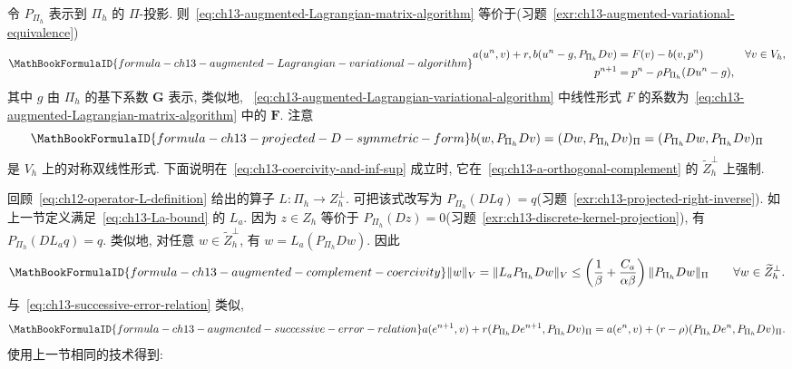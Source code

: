 令 $P_{\Pi_h}$ 表示到 $\Pi_h$ 的 $\Pi$-投影. 则~\eqref{eq:ch13-augmented-Lagrangian-matrix-algorithm} 等价于(习题~\ref{exr:ch13-augmented-variational-equivalence})
\begin{equation}
\MathBookFormulaID{formula-ch13-augmented-Lagrangian-variational-algorithm}
\label{eq:ch13-augmented-Lagrangian-variational-algorithm}
\begin{aligned}
a(u^n,v)+r,b(u^n-g,P_{\Pi_h}Dv)
&=F(v)-b(v,p^n)&&\forall v\in V_h,\\
p^{n+1}&=p^n-\rho P_{\Pi_h}(Du^n-g),
\end{aligned}
\end{equation}
其中 $g$ 由 $\Pi_h$ 的基下系数 $\mathbf G$ 表示, 类似地, ~\eqref{eq:ch13-augmented-Lagrangian-variational-algorithm} 中线性形式 $F$ 的系数为~\eqref{eq:ch13-augmented-Lagrangian-matrix-algorithm} 中的 $\mathbf F$. 注意
\[
\MathBookFormulaID{formula-ch13-projected-D-symmetric-form}
b(w,P_{\Pi_h}Dv)
=(Dw,P_{\Pi_h}Dv)_\Pi
=(P_{\Pi_h}Dw,P_{\Pi_h}Dv)_\Pi
\]
是 $V_h$ 上的对称双线性形式. 下面说明在~\eqref{eq:ch13-coercivity-and-inf-sup} 成立时, 它在~\eqref{eq:ch13-a-orthogonal-complement} 的 $\widetilde Z_h^\perp$ 上强制.

回顾~\eqref{eq:ch12-operator-L-definition} 给出的算子 $L:\Pi_h\to Z_h^\perp$. 可把该式改写为 $P_{\Pi_h}(DLq)=q$(习题~\ref{exr:ch13-projected-right-inverse}). 如上一节定义满足~\eqref{eq:ch13-La-bound} 的 $L_a$. 因为 $z\in Z_h$ 等价于 $P_{\Pi_h}(Dz)=0$(习题~\ref{exr:ch13-discrete-kernel-projection}), 有 $P_{\Pi_h}(DL_aq)=q$. 类似地, 对任意 $w\in\widetilde Z_h^\perp$, 有 $w=L_a(P_{\Pi_h}Dw)$. 因此
\begin{equation}
\MathBookFormulaID{formula-ch13-augmented-complement-coercivity}
\label{eq:ch13-augmented-complement-coercivity}
\|w\|_V=\|L_aP_{\Pi_h}Dw\|_V
\leq\left(\frac1\beta+\frac{C_a}{\alpha\beta}\right)
\|P_{\Pi_h}Dw\|_\Pi
\qquad\forall w\in\widetilde Z_h^\perp.
\end{equation}
与~\eqref{eq:ch13-successive-error-relation} 类似,
\begin{equation}
\MathBookFormulaID{formula-ch13-augmented-successive-error-relation}
\label{eq:ch13-augmented-successive-error-relation}
\begin{aligned}
a(e^{n+1},v)
+r(P_{\Pi_h}De^{n+1},P_{\Pi_h}Dv)_\Pi
=a(e^n,v)
+(r-\rho)(P_{\Pi_h}De^n,P_{\Pi_h}Dv)_\Pi.
\end{aligned}
\end{equation}
使用上一节相同的技术得到:

